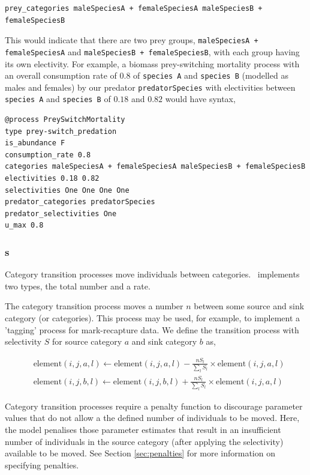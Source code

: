 {\small{\begin{verbatim}
prey_categories maleSpeciesA + femaleSpeciesA maleSpeciesB + femaleSpeciesB
\end{verbatim}}}

This would indicate that there are two prey groups, \texttt{maleSpeciesA + femaleSpeciesA} and \texttt{maleSpeciesB + femaleSpeciesB}, with each group having its own electivity. For example, a biomass prey-switching mortality process with an overall consumption rate of $0.8$ of \texttt{species A} and \texttt{species B} (modelled as males and females) by our predator \texttt{predatorSpecies} with electivities between \texttt{species A} and \texttt{species B} of $0.18$ and $0.82$ would have syntax,

{\small{\begin{verbatim}
@process PreySwitchMortality
type prey-switch_predation
is_abundance F
consumption_rate 0.8
categories maleSpeciesA + femaleSpeciesA maleSpeciesB + femaleSpeciesB
electivities 0.18 0.82
selectivities One One One One
predator_categories predatorSpecies
predator_selectivities One
u_max 0.8
\end{verbatim}}}

\subsubsection{s}

Category transition processes move individuals between categories. \SPM\ implements two types, the total number and a rate. 

The category transition process moves a number $n$ between some source and sink category (or categories). This process may be used, for example, to implement a 'tagging' process for mark-recapture data. We define the transition process with selectivity $S$ for source category $a$ and sink category $b$ as,

\begin{equation}\begin{split}
  & \text{element}(i,j,a,l) \leftarrow \text{element}(i,j,a,l) - \frac{nS_l}{\sum\limits_l S_l} \times \text{element}(i,j,a,l) \\
  & \text{element}(i,j,b,l) \leftarrow \text{element}(i,j,b,l) + \frac{nS_l}{\sum\limits_l S_l} \times \text{element}(i,j,a,l)
\end{split}\end{equation}

Category transition processes require a penalty function to discourage parameter values that do not allow a the defined number of individuals to be moved. Here, the model penalises those parameter estimates that result in an insufficient number of individuals in the source category (after applying the selectivity) available to be moved. See Section \ref{sec:penalties} for more information on specifying penalties.

